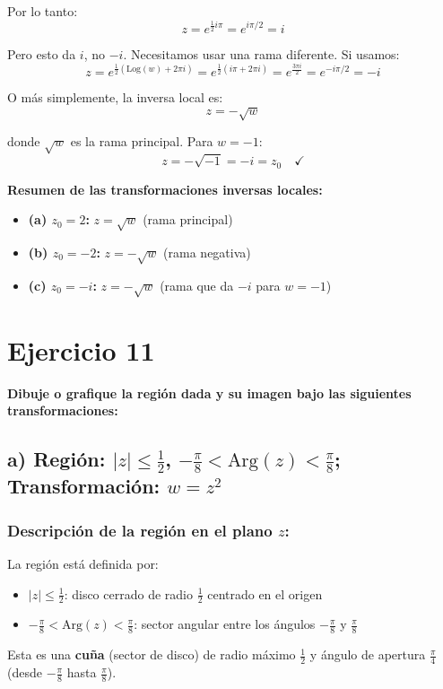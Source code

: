 \documentclass{article}
\begin{document}
Por lo tanto:
$$z = e^{\frac{1}{2}i\pi} = e^{i\pi/2} = i$$

Pero esto da $i$, no $-i$. Necesitamos usar una rama diferente. Si usamos:
$$z = e^{\frac{1}{2}(\text{Log}(w) + 2\pi i)} = e^{\frac{1}{2}(i\pi + 2\pi i)} = e^{\frac{3\pi i}{2}} = e^{-i\pi/2} = -i$$

O más simplemente, la inversa local es:
$$z = -\sqrt{w}$$

donde $\sqrt{w}$ es la rama principal. Para $w = -1$:
$$z = -\sqrt{-1} = -i = z_0 \quad \checkmark$$

\textbf{Resumen de las transformaciones inversas locales:}
\begin{itemize}
\item \textbf{(a) $z_0 = 2$:} $z = \sqrt{w}$ (rama principal)
\item \textbf{(b) $z_0 = -2$:} $z = -\sqrt{w}$ (rama negativa)
\item \textbf{(c) $z_0 = -i$:} $z = -\sqrt{w}$ (rama que da $-i$ para $w = -1$)
\end{itemize}

\newpage
\section*{Ejercicio 11}

\textbf{Dibuje o grafique la región dada y su imagen bajo las siguientes transformaciones:}

\subsection*{a) Región: $|z| \leq \frac{1}{2}$, $-\frac{\pi}{8} < \text{Arg}(z) < \frac{\pi}{8}$; Transformación: $w = z^2$}

\subsubsection*{Descripción de la región en el plano $z$:}

La región está definida por:
\begin{itemize}
\item $|z| \leq \frac{1}{2}$: disco cerrado de radio $\frac{1}{2}$ centrado en el origen
\item $-\frac{\pi}{8} < \text{Arg}(z) < \frac{\pi}{8}$: sector angular entre los ángulos $-\frac{\pi}{8}$ y $\frac{\pi}{8}$
\end{itemize}

Esta es una \textbf{cuña} (sector de disco) de radio máximo $\frac{1}{2}$ y ángulo de apertura $\frac{\pi}{4}$ (desde $-\frac{\pi}{8}$ hasta $\frac{\pi}{8}$).
\end{document}
